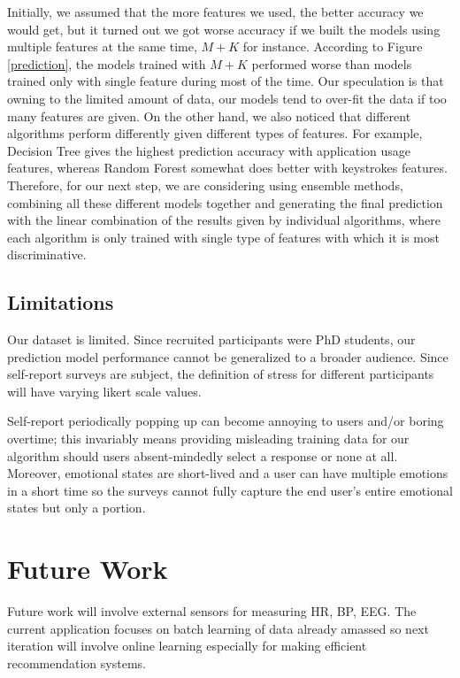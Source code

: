 \documentclass{article}
\begin{document}
Initially, we assumed that the more features we used, the better accuracy we would get, but it turned out we got worse accuracy if we built the models using multiple features at the same time, $M+K$ for instance. According to Figure \ref{prediction}, the models trained with $M+K$ performed worse than models trained only with single feature during most of the time. Our speculation is that owning to the limited amount of data, our models tend to over-fit the data if too many features are given. On the other hand, we also noticed that different algorithms perform differently given different types of features. For example, Decision Tree gives the highest prediction accuracy with application usage features, whereas Random Forest somewhat does better with keystrokes features. Therefore, for our next step, we are considering using ensemble methods, combining all these different models together and generating the final prediction with the linear combination of the results given by individual algorithms, where each algorithm is only trained with single type of features with which it is most discriminative.  


 
\subsection{Limitations}
Our dataset is limited. Since recruited participants were PhD students, our prediction model performance cannot be generalized to a broader audience. Since self-report surveys are subject, the definition of stress for different participants will have varying likert scale values. 

Self-report periodically popping up can become annoying to users and/or boring overtime; this invariably means providing misleading training data for our algorithm should users absent-mindedly select a response or none at all. Moreover, emotional states are short-lived and a user can have multiple emotions in a short time so the surveys cannot fully capture the end user's entire emotional states but only a portion.

\section{Future Work}
Future work will involve external sensors for measuring HR, BP, EEG. The current application focuses on batch learning of data already amassed so next iteration will involve online learning especially for making efficient recommendation systems. 
\end{document}
